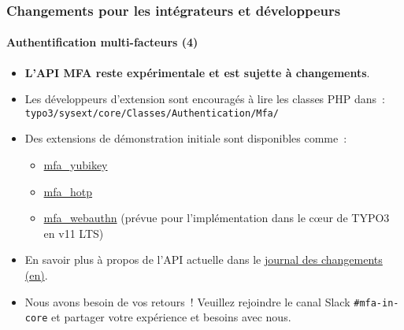 %

\begin{frame}[fragile]
	\frametitle{Changements pour les intégrateurs et développeurs}
	\framesubtitle{Authentification multi-facteurs (4)}

	\begin{itemize}

		\item \textbf{L'API MFA reste expérimentale et est sujette à changements}.

		\item Les développeurs d'extension sont encouragés à lire les classes PHP dans~:\newline
			\small\texttt{typo3/sysext/core/Classes/Authentication/Mfa/}\normalsize

		\item Des extensions de démonstration initiale sont disponibles comme~:

			\begin{itemize}\small
				\item \href{https://github.com/derhansen/mfa_yubikey}{mfa\_yubikey}
				\item \href{https://github.com/o-ba/mfa_hotp}{mfa\_hotp}
				\item \href{https://github.com/bnf/mfa_webauthn}{mfa\_webauthn} (prévue pour l'implémentation dans le cœur de TYPO3 en v11 LTS)
			\end{itemize}\normalsize

		\item En savoir plus à propos de l'API actuelle dans le
			\href{https://docs.typo3.org/c/typo3/cms-core/master/en-us/Changelog/11.1/Feature-93526-MultiFactorAuthentication.html}{journal des changements (en)}.

		\item Nous avons besoin de vos retours~! Veuillez rejoindre le canal Slack \texttt{\#mfa-in-core}
			et partager votre expérience et besoins avec nous.

	\end{itemize}

\end{frame}

